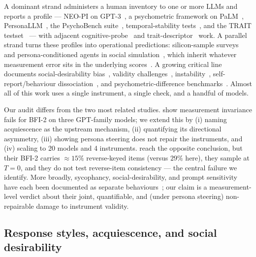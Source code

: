 \documentclass{article}
\begin{document}
A dominant strand administers a human inventory to one or more LLMs and reports a profile --- NEO-PI on GPT-3~\citep{miotto2023gpt3}, a psychometric framework on PaLM~\citep{serapio2025psychometric}, PersonaLLM~\citep{jiang2023personallm}, the PsychoBench suite~\citep{huang2023psychobench}, temporal-stability tests~\citep{bodroza2024personality}, and the TRAIT testset~\citep{lee2025trait} --- with adjacent cognitive-probe~\citep{binz2023psychology} and trait-descriptor~\citep{suh2024rediscovering} work. A parallel strand turns these profiles into operational predictions: silicon-sample surveys~\citep{argyle2023one,horton2023homo,aher2023using,park2023generative,ferreira2025matching} and persona-conditioned agents in social simulation~\citep{chuang2023simulating,cau2025language,chuang2025debate}, which inherit whatever measurement error sits in the underlying scores~\citep{tjuatja2023response,salecha2024llm,larooij2025validation}. A growing critical line documents social-desirability bias~\citep{salecha2024llm}, validity challenges~\citep{suhr2025challenging}, instability~\citep{pelet2025persistent}, self-report/behaviour dissociation~\citep{han2025personality,mannekote2025roleplaying}, and psychometric-difference benchmarks~\citep{xie2025aipsychobench,chen2025humanizing}. Almost all of this work uses a single instrument, a single check, and a handful of models.

Our audit differs from the two most related studies. \citet{suhr2025challenging} show measurement invariance fails for BFI-2 on three GPT-family models; we extend this by (i) naming acquiescence as the upstream mechanism, (ii) quantifying its directional asymmetry, (iii) showing persona steering does not repair the instruments, and (iv) scaling to 20 models and 4 instruments. \citet{serapio2025psychometric} reach the opposite conclusion, but their BFI-2 carries $\approx15\%$ reverse-keyed items (versus $29\%$ here), they sample at $T{=}0$, and they do not test reverse-item consistency --- the central failure we identify. More broadly, sycophancy, social-desirability, and prompt sensitivity have each been documented as separate behaviours~\citep{perez2023discovering,sharma2024sycophancy,salecha2024llm}; our claim is a measurement-level verdict about their joint, quantifiable, and (under persona steering) non-repairable damage to instrument validity.

\subsection{Response styles, acquiescence, and social desirability}
\label{sec:related-styles}
\end{document}
